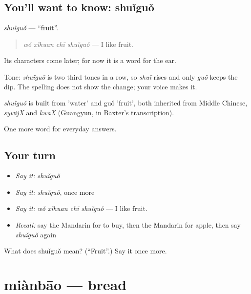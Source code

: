\subsection*{You'll want to know: shuǐguǒ}
\emph{shuǐguǒ} — \textquotedblleft{}fruit\textquotedblright{}.

\begin{quote}
\emph{wǒ xǐhuan chī shuǐguǒ} — I like fruit.
\end{quote}

Its characters come later; for now it is a word for the ear.

Tone: \emph{shuǐguǒ} is two third tones in a row, so \emph{shuǐ} rises and only \emph{guǒ} keeps the dip. The spelling does not show the change; your voice makes it.

\begin{cousinweb}
\emph{shuǐguǒ} is built from  'water' and guǒ 'fruit', both inherited from Middle Chinese, \emph{sywijX} and \emph{kwaX} (Guangyun, in Baxter's transcription).
\end{cousinweb}

\begin{grammarlens}[title={What you've built}]
One more word for everyday answers.
\end{grammarlens}

\subsection*{Your turn}
\begin{itemize}
\raggedright
  \item \emph{Say it:} \emph{shuǐguǒ}
  \item \emph{Say it:} \emph{shuǐguǒ}, once more
  \item \emph{Say it:} \emph{wǒ xǐhuan chī shuǐguǒ} — I like fruit.
  \item \emph{Recall:} say the Mandarin for to buy, then the Mandarin for apple, then say \emph{shuǐguǒ} again
\end{itemize}

\begin{tcolorbox}[breakable,colback=teal!4,colframe=teal!35!black,title={Before you move on}]
What does shuǐguǒ mean? (\textquotedblleft{}Fruit\textquotedblright{}.) Say it once more.
\end{tcolorbox}
\section[miànbāo]{miànbāo — bread}

